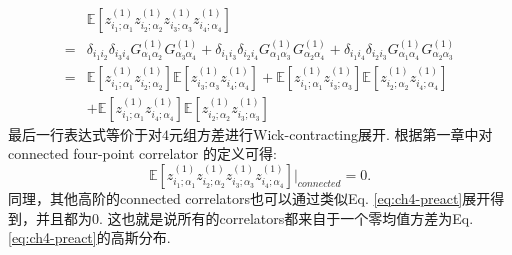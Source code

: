\begin{equation}
    \begin{aligned}
       & \mathbb{E}\left[z_{i_1;\alpha_1}^{(1)}z_{i_2;\alpha_2}^{(1)}
        z_{i_3;\alpha_3}^{(1)}z_{i_4;\alpha_4}^{(1)}\right] \\
       =& \delta_{i_1i_2}\delta_{i_3i_4}G_{\alpha_1\alpha_2}^{(1)}G_{\alpha_3\alpha_4}^{(1)}
       + \delta_{i_1i_3}\delta_{i_2i_4}G_{\alpha_1\alpha_3}^{(1)}G_{\alpha_2\alpha_4}^{(1)}
       + \delta_{i_1i_4}\delta_{i_2i_3}G_{\alpha_1\alpha_4}^{(1)}G_{\alpha_2\alpha_3}^{(1)} \\
       =& \mathbb{E}\left[z_{i_1;\alpha_1}^{(1)}z_{i_2;\alpha_2}^{(1)}\right]
          \mathbb{E}\left[z_{i_3;\alpha_3}^{(1)}z_{i_4;\alpha_4}^{(1)}\right]
       + \mathbb{E}\left[z_{i_1;\alpha_1}^{(1)}z_{i_3;\alpha_3}^{(1)}\right]
          \mathbb{E}\left[z_{i_2;\alpha_2}^{(1)}z_{i_4;\alpha_4}^{(1)}\right] \\
       & + \mathbb{E}\left[z_{i_1;\alpha_1}^{(1)}z_{i_4;\alpha_4}^{(1)}\right]
          \mathbb{E}\left[z_{i_2;\alpha_2}^{(1)}z_{i_3;\alpha_3}^{(1)}\right]
    \end{aligned}
\end{equation}
最后一行表达式等价于对$4$元组方差进行Wick-contracting展开. 根据第一章中对connected four-point correlator
的定义可得:
\begin{equation}
    \mathbb{E}\left[z_{i_1;\alpha_1}^{(1)}z_{i_2;\alpha_2}^{(1)}
    z_{i_3;\alpha_3}^{(1)}z_{i_4;\alpha_4}^{(1)}\right] \Big|_{connected} = 0.
\end{equation}
同理，其他高阶的connected correlators也可以通过类似Eq. \ref{eq:ch4-preact}展开得到，并且都为$0$. 
这也就是说所有的correlators都来自于一个零均值方差为Eq. \ref{eq:ch4-preact}的高斯分布.


